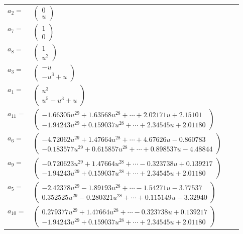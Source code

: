\documentclass[1p]{elsarticle_modified}
\theoremstyle{definition}
\begin{document}
\begin{tabular}{m{7pt} m{180pt} m{7pt} m{180pt} }
\flushright $a_{2}=$&$\begin{pmatrix}0\\u\end{pmatrix}$ \\
\flushright $a_{7}=$&$\begin{pmatrix}1\\0\end{pmatrix}$ \\
\flushright $a_{8}=$&$\begin{pmatrix}1\\u^2\end{pmatrix}$ \\
\flushright $a_{3}=$&$\begin{pmatrix}- u\\- u^3+u\end{pmatrix}$ \\
\flushright $a_{1}=$&$\begin{pmatrix}u^3\\u^5- u^3+u\end{pmatrix}$ \\
\flushright $a_{11}=$&$\begin{pmatrix}-1.66305 u^{29}+1.63568 u^{28}+\cdots+2.02171 u+2.15101\\-1.94243 u^{29}+0.159037 u^{28}+\cdots+2.34545 u+2.01180\end{pmatrix}$ \\
\flushright $a_{6}=$&$\begin{pmatrix}-4.72062 u^{29}+1.47664 u^{28}+\cdots+4.67626 u-0.860783\\-0.183577 u^{29}+0.615857 u^{28}+\cdots+0.898537 u-4.48844\end{pmatrix}$ \\
\flushright $a_{9}=$&$\begin{pmatrix}-0.720623 u^{29}+1.47664 u^{28}+\cdots-0.323738 u+0.139217\\-1.94243 u^{29}+0.159037 u^{28}+\cdots+2.34545 u+2.01180\end{pmatrix}$ \\
\flushright $a_{5}=$&$\begin{pmatrix}-2.42378 u^{29}-1.89193 u^{28}+\cdots-1.54271 u-3.77537\\0.352525 u^{29}-0.280321 u^{28}+\cdots+0.115149 u-3.32940\end{pmatrix}$ \\
\flushright $a_{10}=$&$\begin{pmatrix}0.279377 u^{29}+1.47664 u^{28}+\cdots-0.323738 u+0.139217\\-1.94243 u^{29}+0.159037 u^{28}+\cdots+2.34545 u+2.01180\end{pmatrix}$ \\

\end{tabular}
\end{document}
